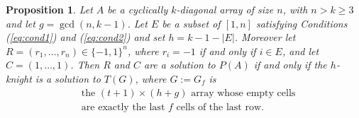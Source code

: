 \documentclass[10pt,a4paper]{amsart}
\newtheorem{prop}{Proposition}
\begin{document}
\begin{prop} \label{thm:main_eqv}
Let $A$ be a cyclically $k$-diagonal array of size $n$, with $n>k \geq 3$ and let $g= \gcd(n,k-1)$. Let $E$ be a subset of $[1,n]$ satisfying Conditions (\ref{eq:cond1}) and (\ref{eq:cond2}) and set $h=k-1-|E|$. Moreover let $R = (r_1,\dotsc, r_n) \in \{-1,1\}^n$, where $r_i = -1$ if and only if $i \in E$, and let $C = (1,\dotsc,1)$. Then $R$ and $C$ are a solution to $P(A)$ if and only if the $h$-knight is a solution to $T(G)$, where $G:=G_f$ is
\begin{equation} \label{eq:procedureD}
\begin{aligned}
&\text{the\ $(t+1)\times (h+g)$\ array\ whose\ empty\ cells}\\
&\text{are\ exactly\ the\ last\ $f$\ cells\ of\ the\ last\ row.}
\end{aligned}
\end{equation}
\end{prop}
\end{document}

